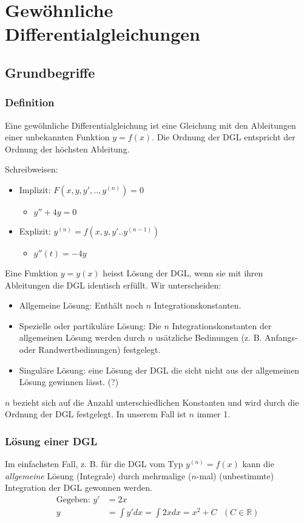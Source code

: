 \chapter{Gewöhnliche Differentialgleichungen}
\section{Grundbegriffe}
\subsection{Definition}
\begin{definition}
Eine gewöhnliche Differentialgleichung ist eine Gleichung mit den Ableitungen einer unbekannten Funktion $y=f(x)$. Die Ordnung der DGL entspricht der Ordnung der höchsten Ableitung.

Schreibweisen:
\begin{itemize}
	\item Implizit: $F(x, y, y', .. ,y^{(n)}) = 0$
	\begin{itemize}
		\item $y'' + 4y = 0$
	\end{itemize}
	\item Explizit: $y^{(n)} = f(x, y, y' .. y^{(n-1)})$
	\begin{itemize}
		\item $y''(t) = -4y$
	\end{itemize}
\end{itemize}

Eine Funktion $y=y(x)$ heisst Lösung der DGL, wenn sie mit ihren Ableitungen die DGL identisch erfüllt. Wir unterscheiden:
\begin{itemize}
	\item Allgemeine Lösung: Enthält noch $n$ Integrationskonstanten.
	\item Spezielle oder partikuläre Lösung: Die $n$ Integrationskonstanten der allgemeinen Lösung werden durch $n$ usätzliche Bedinungen (z. B. Anfangs- oder Randwertbedinungen) festgelegt.
	\item Singuläre Lösung: eine Lösung der DGL die sicht nicht aus der allgemeinen Lösung gewinnen lässt. (?)
\end{itemize}
$n$ bezieht sich auf die Anzahl unterschiedlichen Konstanten und wird durch die Ordnung der DGL festgelegt. In unserem Fall ist $n$ immer 1.
\end{definition}

\subsection{Lösung einer DGL}
Im einfachsten Fall, z. B. für die DGL vom Typ $y^{(n)} = f(x)$ kann die \textit{allgemeine} Lösung (Integrale) durch mehrmalige ($n$-mal) (unbestimmte) Integration der DGL gewonnen werden.
\begin{align*}
	 \text{Gegeben: } y' &= 2x\\
	  y &= \int y' dx = \int 2x dx = x^2 + C  \text{        }(C \in \mathbb{R})	
\end{align*}

